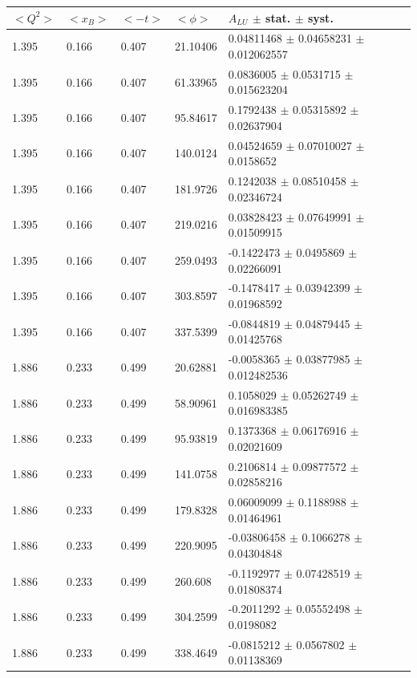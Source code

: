 \begin{table}[!h]
   \begin{center}
      \begin{tabular}{||l|l|l|l|l||}
         \hline
 $<Q^{2}>$ & $<x_{B}>$ & $<-t>$ & $<\phi>$ & $A_{LU}$ $\pm$ stat. $\pm$ syst.\\
 \hline  
  1.395 & 0.166 & 0.407  &   21.10406  &  0.04811468 $\pm$  0.04658231  $\pm$  0.012062557     \\
  1.395 & 0.166 & 0.407  &   61.33965  &  0.0836005  $\pm$  0.0531715   $\pm$  0.015623204     \\
  1.395 & 0.166 & 0.407  &   95.84617  &  0.1792438  $\pm$  0.05315892  $\pm$  0.02637904      \\
  1.395 & 0.166 & 0.407  &   140.0124  &  0.04524659 $\pm$  0.07010027  $\pm$  0.0158652       \\
  1.395 & 0.166 & 0.407  &   181.9726  &  0.1242038  $\pm$  0.08510458  $\pm$  0.02346724      \\
  1.395 & 0.166 & 0.407  &   219.0216  &  0.03828423 $\pm$  0.07649991  $\pm$  0.01509915      \\
  1.395 & 0.166 & 0.407  &   259.0493  &  -0.1422473 $\pm$  0.0495869   $\pm$  0.02266091      \\
  1.395 & 0.166 & 0.407  &   303.8597  &  -0.1478417 $\pm$  0.03942399  $\pm$  0.01968592      \\
  1.395 & 0.166 & 0.407  &   337.5399  &  -0.0844819 $\pm$  0.04879445  $\pm$  0.01425768      \\
 \hline
                                                                      
  1.886 & 0.233 & 0.499 &    20.62881  &  -0.0058365 $\pm$  0.03877985  $\pm$  0.012482536     \\
  1.886 & 0.233 & 0.499 &    58.90961  &  0.1058029  $\pm$  0.05262749  $\pm$  0.016983385     \\
  1.886 & 0.233 & 0.499 &    95.93819  &  0.1373368  $\pm$  0.06176916  $\pm$  0.02021609      \\
  1.886 & 0.233 & 0.499 &    141.0758  &  0.2106814  $\pm$  0.09877572  $\pm$  0.02858216      \\
  1.886 & 0.233 & 0.499 &    179.8328  &  0.06009099 $\pm$  0.1188988   $\pm$  0.01464961      \\
  1.886 & 0.233 & 0.499 &    220.9095  &  -0.03806458 $\pm$  0.1066278   $\pm$  
 0.04304848      \\
  1.886 & 0.233 & 0.499 &    260.608   &  -0.1192977 $\pm$  0.07428519  $\pm$  0.01808374      \\
  1.886 & 0.233 & 0.499 &    304.2599  &  -0.2011292 $\pm$  0.05552498  $\pm$  0.0198082       \\
  1.886 & 0.233 & 0.499 &    338.4649  &  -0.0815212 $\pm$  0.0567802   $\pm$  0.01138369      \\
 \hline
                                                                      

\end{tabular}
\end{center}
\end{table}
